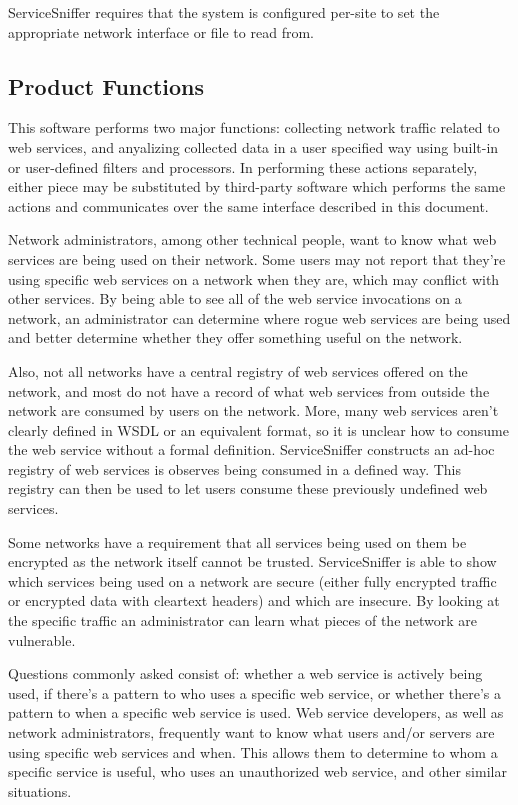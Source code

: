 \documentclass[titlepage]{article}
\begin{document}
ServiceSniffer requires that the system is configured per-site to set the
appropriate network interface or file to read from.


\subsection{Product Functions%
  \label{product-functions}%
}

This software performs two major functions: collecting network traffic related
to web services, and anyalizing collected data in a user specified
way using built-in or user-defined filters and processors.  In performing these
actions separately, either piece may be substituted by third-party software
which performs the same actions and communicates over the same interface
described in this document.  

Network administrators, among other technical people, want to know what web
services are being used on their network.  Some users may not report that
they're using specific web services on a network when they are, which may 
conflict with other services.  By being able to see all of the web service
invocations on a network, an administrator can determine where rogue web
services are being used and better determine whether they offer something
useful on the network.  

Also, not all networks have a central registry of web services offered on the
network, and most do not have a record of what web services from outside the
network are consumed by users on the network.  More, many web services aren't
clearly defined in WSDL or an equivalent format, so it is unclear how to consume
the web service without a formal definition.  ServiceSniffer constructs an
ad-hoc registry of web services is observes being consumed in a defined way.
This registry can then be used to let users consume these previously undefined
web services.

Some networks have a requirement that all services being used on them be
encrypted as the network itself cannot be trusted.  ServiceSniffer is able to
show which services being used on a network are secure (either fully encrypted
traffic or encrypted data with cleartext headers) and which are insecure.  By
looking at the specific traffic an administrator can learn what pieces of the
network are vulnerable.

Questions commonly asked consist of: whether a web service is actively being used, if
there's a pattern to who uses a specific web service, or whether there's a
pattern to when a specific web service is used.  Web service developers,
as well as network administrators, frequently want to know what users and/or
servers are using specific web services and when.  This allows them to
determine to whom a specific service is useful, who uses an unauthorized web
service, and other similar situations.
\end{document}
